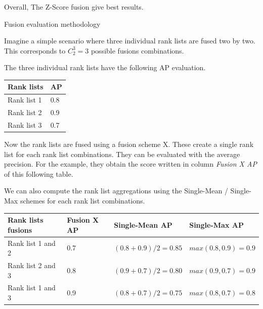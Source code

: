 Overall, The Z-Score fusion give best results.

\begin{example*}
  \caption{Fusion evaluation methodology}
  \label{ex:fusion_eval}

  Imagine a simple scenario where three individual rank lists are fused two by two.
  This corresponds to $C^3_2 = 3$ possible fusions combinations.

  The three individual rank lists have the following AP evaluation.

  \vspace{0.2cm}

  \begin{center}
    \begin{tabular}{l l}
      \toprule
      Rank lists & AP \\
      \midrule
      Rank list 1 & 0.8 \\
      Rank list 2 & 0.9 \\
      Rank list 3 & 0.7 \\
      \bottomrule
    \end{tabular}
  \end{center}

  \vspace{0.5cm}

  Now the rank lists are fused using a fusion scheme X.
  These create a single rank list for each rank list combinations.
  They can be evaluated with the average precision.
  For the example, they obtain the score written in column \textit{Fusion X AP} of this following table.

  We can also compute the rank list aggregations using the Single-Mean / Single-Max schemes for each rank list combinations.

  \vspace{0.2cm}

  \begin{center}
    \begin{tabular}{l|l l l}
      \toprule
      Rank lists fusions      & Fusion X AP   & Single-Mean AP   & Single-Max AP\\
      \midrule
      Rank list 1 and 2 & 0.7 & $(0.8 + 0.9) / 2 = 0.85$ & $max(0.8, 0.9) = 0.9$\\
      Rank list 2 and 3 & 0.8 & $(0.9 + 0.7) / 2 = 0.80$ & $max(0.9, 0.7) = 0.9$\\
      Rank list 1 and 3 & 0.9 & $(0.8 + 0.7) / 2 = 0.75$ & $max(0.8, 0.7) = 0.8$\\
      \bottomrule
    \end{tabular}
  \end{center}


\end{example*}
